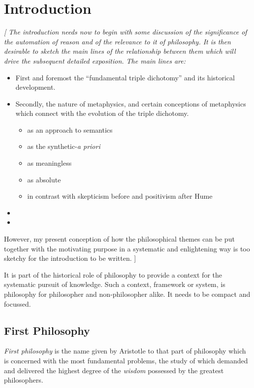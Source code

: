 
\chapter{Introduction}

{\it
[
The introduction needs now to begin with some discussion of the significance of the automation of reason and of the relevance to it of philosophy.
It is then desirable to sketch the main lines of the relationship between them which will drive the subsequent detailed exposition.
The main lines are:
\begin{itemize}
\item First and foremost the ``fundamental triple dichotomy'' and its historical development.
\item Secondly, the nature of metaphysics, and certain conceptions of metaphysics which connect with the evolution of the triple dichotomy.
\begin{itemize}
\item as an approach to semantics
\item as the synthetic-\emph{a priori}
\item as meaningless
\item as absolute
\item in contrast with skepticism before and positivism after Hume
\end{itemize}
\item 
\item
\end{itemize}

However, my present conception of how the philosophical themes can be put together with the motivating purpose in a systematic and enlightening way is too sketchy for the introduction to be written.
]
}

It is part of the historical role of philosophy to provide a context for the systematic pursuit of knowledge.
Such a context, framework or system, is philosophy for philosopher and non-philosopher alike.
It needs to be compact and focussed.

\section{First Philosophy}

{\it First philosophy} is the name given by Aristotle to that part of philosophy which is concerned with the most fundamental problems, the study of which demanded and delivered the highest degree of the {\it wisdom} possessed by the greatest philosophers.

